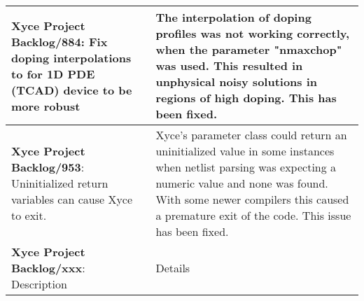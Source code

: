 {\begin{longtable}[h] {>{\raggedright\small}m{2in}|>{\raggedright\let\\\tabularnewline\small}m{3.5in}}
  \textbf{Xyce Project Backlog/884}: Fix doping interpolations to for 1D PDE (TCAD) device to be more robust
  & The interpolation of doping profiles was not working correctly, when the parameter "nmaxchop" was used.  
  This resulted in unphysical noisy solutions in regions of high doping.  This has been fixed.
  \\\hline
  
  \textbf{Xyce Project Backlog/953}: Uninitialized return variables can cause Xyce to exit.
  &  Xyce's parameter class could return an uninitialized value in some instances when 
  netlist parsing was expecting a numeric value and none was found.  With some newer compilers
  this caused a premature exit of the code.  This issue has been fixed.
  \\\hline
  
\textbf{Xyce Project Backlog/xxx}: Description
  &  Details
  \\\hline


\end{longtable}
}
